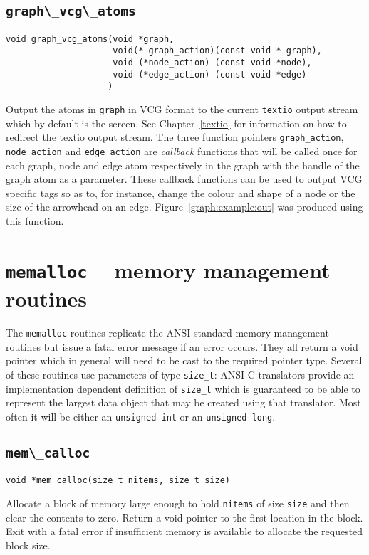 \section{\protect\verb+graph\_vcg\_atoms+}
\begin{verbatim}
void graph_vcg_atoms(void *graph,
                     void(* graph_action)(const void * graph), 
                     void (*node_action) (const void *node),
                     void (*edge_action) (const void *edge)
                    )
\end{verbatim}
Output the atoms in {\tt graph} in VCG format to the current {\tt textio} output
stream which by default is the screen. See Chapter~\ref{textio} for
information on how to redirect the textio output stream. The three
function pointers \verb+graph_action+, \verb+node_action+ and
\verb+edge_action+ are {\em callback} functions that will be called once
for each graph, node and edge atom respectively in the graph with the
handle of the graph atom as a parameter. These callback functions can be
used to output VCG specific tags so as to, for instance, change the
colour and shape of a node or the size of the arrowhead on an edge.
Figure~\ref{graph:example:out} was produced using this function.


\chapter{{\tt memalloc} -- memory management routines}

The {\tt memalloc} routines replicate the ANSI standard memory
management routines but issue a fatal error message if an error occurs.
They all return a void pointer which in general will need to be cast to
the required pointer type. Several of these routines use parameters of
type \verb+size_t+: ANSI C translators provide an implementation
dependent definition of \verb+size_t+ which is guaranteed to be able to
represent the largest data object that may be created using that
translator. Most often it will be either an {\tt unsigned~int} or an
{\tt unsigned~long}.

\section{\protect\verb+mem\_calloc+}
\begin{verbatim}
void *mem_calloc(size_t nitems, size_t size)
\end{verbatim}
Allocate a block of memory large enough to hold {\tt nitems} of size
{\tt size} and then clear the contents to zero. Return a void pointer to the
first location in the block. Exit with a fatal error if insufficient
memory is available to allocate the requested block size.

